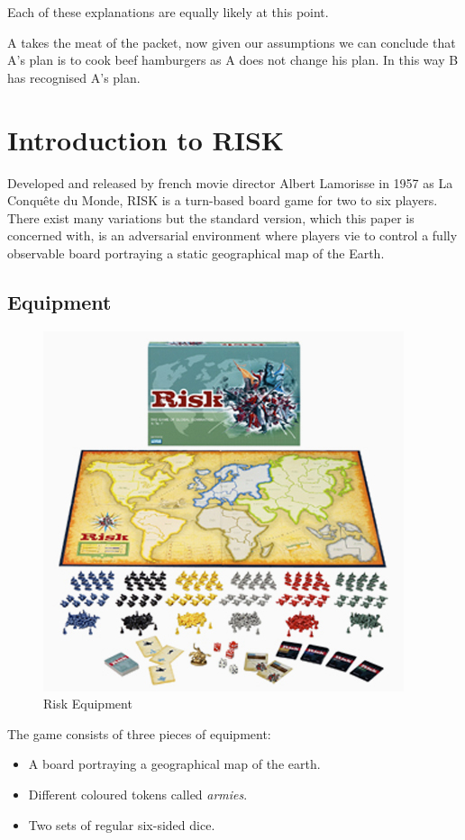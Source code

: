 \documentclass[parskip]{cs4rep}
\begin{document}
Each of these explanations are equally likely at this point.

A takes the meat of the packet, now given our assumptions we can conclude that A's plan is to cook beef hamburgers as A does not change his plan. In this way B has recognised A's plan.

\newpage

\section{Introduction to RISK}

Developed and released by french movie director Albert Lamorisse in 1957 as La Conqu\^ete du Monde, RISK is a turn-based board game for two to six players. There exist many variations but the standard version, which this paper is concerned with, is an adversarial environment where players vie to control a fully observable board portraying a static geographical map of the Earth.

\subsection{Equipment}

\begin{figure}[h]
\centering
\includegraphics{images/risk-board}
\caption{Risk Equipment}
\label{fig:risk-equipment}
\end{figure}

The game consists of three pieces of equipment:

\begin{itemize}
\item
A board portraying a geographical map of the earth.
\item
Different coloured tokens called \textit{armies}.
\item
Two sets of regular six-sided dice.
\end{itemize}
\end{document}
